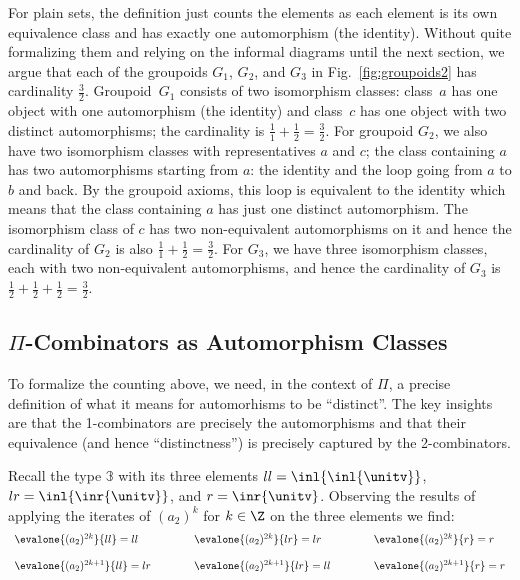 For plain sets, the definition just counts the elements as each element is its
own equivalence class and has exactly one automorphism (the identity). Without
quite formalizing them and relying on the informal diagrams until the next
section, we argue that each of the groupoids $G_1$, $G_2$, and $G_3$ in
Fig.~\ref{fig:groupoids2} has cardinality $\frac{3}{2}$. Groupoid~$G_1$ consists
of two isomorphism classes: class~$a$ has one object with one automorphism (the
identity) and class~$c$ has one object with two distinct automorphisms; the
cardinality is $\frac{1}{1} + \frac{1}{2} = \frac{3}{2}$. For groupoid $G_2$, we
also have two isomorphism classes with representatives $a$ and $c$; the class
containing $a$ has two automorphisms starting from $a$: the identity and the
loop going from $a$ to $b$ and back. By the groupoid axioms, this loop is
equivalent to the identity which means that the class containing $a$ has just
one distinct automorphism. The isomorphism class of $c$ has two non-equivalent
automorphisms on it and hence the cardinality of $G_2$ is also
$\frac{1}{1} + \frac{1}{2} = \frac{3}{2}$. For $G_3$, we have three isomorphism
classes, each with two non-equivalent automorphisms, and hence the cardinality
of $G_3$ is $\frac{1}{2} + \frac{1}{2} + \frac{1}{2} = \frac{3}{2}$.

\subsection{$\Pi$-Combinators as Automorphism Classes}

To formalize the counting above, we need, in the context of $\Pi$, a precise
definition of what it means for automorhisms to be ``distinct''. The key
insights are that the 1-combinators are precisely the automorphisms and that
their equivalence (and hence ``distinctness'') is precisely captured by the
2-combinators.

Recall the type $\mathbb{3}$ with its three elements $ll=\inl{\inl{\unitv}}$,
$lr=\inl{\inr{\unitv}}$, and $r=\inr{\unitv}$. Observing the results of applying
the iterates of $(a_2)^k$ for $k \in \Z$ on the three elements we find:
\[\begin{array}{l@{\qquad\qquad}l@{\qquad\qquad}l}
\evalone{(a_2)^{2k}}{ll} = ll &
\evalone{(a_2)^{2k}}{lr} = lr &
\evalone{(a_2)^{2k}}{r} = r \\
\\
\evalone{(a_2)^{2k+1}}{ll} = lr &
\evalone{(a_2)^{2k+1}}{lr} = ll &
\evalone{(a_2)^{2k+1}}{r} = r
\end{array}\]

